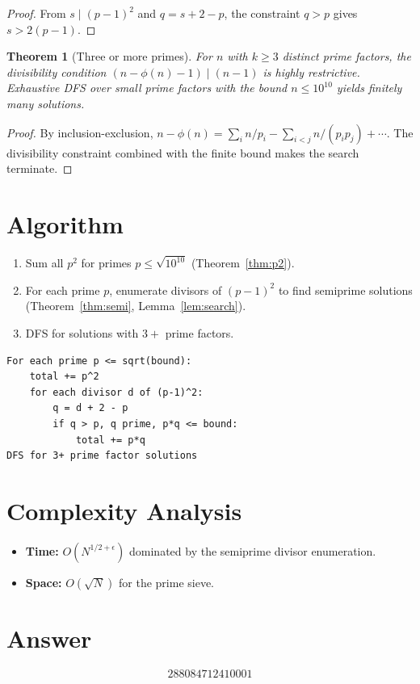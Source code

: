 \documentclass[12pt]{article}
\newtheorem{theorem}{Theorem}
\begin{document}
\begin{proof}
From $s\mid(p-1)^2$ and $q=s+2-p$, the constraint $q>p$ gives $s>2(p-1)$.
\end{proof}

\begin{theorem}[Three or more primes]
For $n$ with $k\ge 3$ distinct prime factors, the divisibility condition $(n-\phi(n)-1)\mid(n-1)$ is highly restrictive. Exhaustive DFS over small prime factors with the bound $n\le 10^{10}$ yields finitely many solutions.
\end{theorem}

\begin{proof}
By inclusion-exclusion, $n-\phi(n)=\sum_{i}n/p_i-\sum_{i<j}n/(p_ip_j)+\cdots$. The divisibility constraint combined with the finite bound makes the search terminate.
\end{proof}

\section{Algorithm}

\begin{enumerate}
\item Sum all $p^2$ for primes $p\le\sqrt{10^{10}}$ (Theorem~\ref{thm:p2}).
\item For each prime $p$, enumerate divisors of $(p-1)^2$ to find semiprime solutions (Theorem~\ref{thm:semi}, Lemma~\ref{lem:search}).
\item DFS for solutions with $3+$ prime factors.
\end{enumerate}

\begin{verbatim}
For each prime p <= sqrt(bound):
    total += p^2
    for each divisor d of (p-1)^2:
        q = d + 2 - p
        if q > p, q prime, p*q <= bound:
            total += p*q
DFS for 3+ prime factor solutions
\end{verbatim}

\section{Complexity Analysis}

\begin{itemize}
\item \textbf{Time:} $O(N^{1/2+\epsilon})$ dominated by the semiprime divisor enumeration.
\item \textbf{Space:} $O(\sqrt{N})$ for the prime sieve.
\end{itemize}

\section{Answer}

\[
\boxed{288084712410001}
\]
\end{document}
